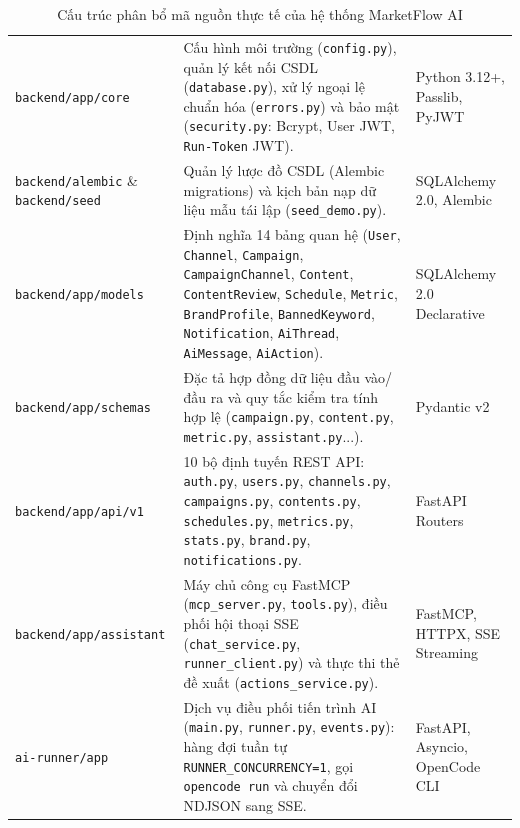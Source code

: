 \begin{table}[!htbp]
\centering
\footnotesize
\renewcommand{\arraystretch}{1.05}
\caption{Cấu trúc phân bổ mã nguồn thực tế của hệ thống MarketFlow AI}
\label{tab:source-tree}
\begin{tabularx}{\textwidth}{|L{4.2cm}|Y|L{3.1cm}|}
\hline
{} &  & \\
\hline
\texttt{backend/app/core} & Cấu hình môi trường (\texttt{config.py}), quản lý kết nối CSDL (\texttt{database.py}), xử lý ngoại lệ chuẩn hóa (\texttt{errors.py}) và bảo mật (\texttt{security.py}: Bcrypt, User JWT, \texttt{Run-Token} JWT). & Python 3.12+, Passlib, PyJWT\\
\hline
\texttt{backend/alembic} \& \texttt{backend/seed} & Quản lý lược đồ CSDL (Alembic migrations) và kịch bản nạp dữ liệu mẫu tái lập (\texttt{seed\_demo.py}). & SQLAlchemy 2.0, Alembic\\
\hline
\texttt{backend/app/models} & Định nghĩa 14 bảng quan hệ (\texttt{User}, \texttt{Channel}, \texttt{Campaign}, \texttt{CampaignChannel}, \texttt{Content}, \texttt{ContentReview}, \texttt{Schedule}, \texttt{Metric}, \texttt{BrandProfile}, \texttt{BannedKeyword}, \texttt{Notification}, \texttt{AiThread}, \texttt{AiMessage}, \texttt{AiAction}). & SQLAlchemy 2.0 Declarative\\
\hline
\texttt{backend/app/schemas} & Đặc tả hợp đồng dữ liệu đầu vào/đầu ra và quy tắc kiểm tra tính hợp lệ (\texttt{campaign.py}, \texttt{content.py}, \texttt{metric.py}, \texttt{assistant.py}...). & Pydantic v2\\
\hline
\texttt{backend/app/api/v1} & 10 bộ định tuyến REST API: \texttt{auth.py}, \texttt{users.py}, \texttt{channels.py}, \texttt{campaigns.py}, \texttt{contents.py}, \texttt{schedules.py}, \texttt{metrics.py}, \texttt{stats.py}, \texttt{brand.py}, \texttt{notifications.py}. & FastAPI Routers\\
\hline
\texttt{backend/app/assistant} & Máy chủ công cụ FastMCP (\texttt{mcp\_server.py}, \texttt{tools.py}), điều phối hội thoại SSE (\texttt{chat\_service.py}, \texttt{runner\_client.py}) và thực thi thẻ đề xuất (\texttt{actions\_service.py}). & FastMCP, HTTPX, SSE Streaming\\
\hline
\texttt{ai-runner/app} & Dịch vụ điều phối tiến trình AI (\texttt{main.py}, \texttt{runner.py}, \texttt{events.py}): hàng đợi tuần tự \texttt{RUNNER\_CONCURRENCY=1}, gọi \texttt{opencode run} và chuyển đổi NDJSON sang SSE. & FastAPI, Asyncio, OpenCode CLI\\

\end{tabularx}
\end{table}
